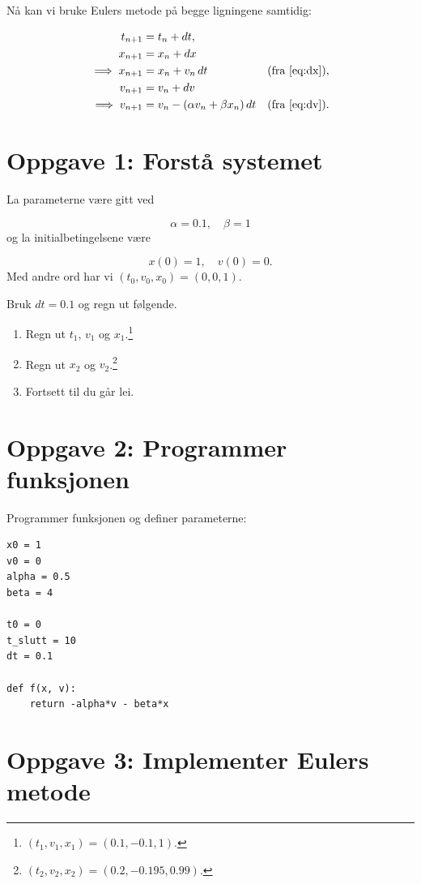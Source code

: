 \documentclass[a4paper,12pt]{article}
\begin{document}
Nå kan vi bruke Eulers metode på begge ligningene samtidig:

\begin{subequations}
\begin{align}
t_{n+1} &= t_n + dt,\\
x_{n+1} &= x_n + dx \\
\implies x_{n+1} &= x_n + v_n\, dt &(\text{fra \eqref{eq:dx}}), \\
v_{n+1} &= v_n + dv\\
\implies v_{n+1} &= v_n - (\alpha v_n + \beta x_n)\, dt &(\text{fra \eqref{eq:dv}}).
\end{align}
\end{subequations}

\section*{Oppgave 1: Forstå systemet}

La parameterne være gitt ved

\[
\alpha =  0.1, \quad \beta = 1
\]
og la initialbetingelsene være

\[
x(0) = 1, \quad v(0) = 0.
\]
Med andre ord har vi $(t_0,v_0,x_0) = (0,0,1)$.


Bruk $dt = 0.1$ og regn ut følgende.

\begin{enumerate}[label=\alph*)]
\item Regn ut $t_1$, $v_1$ og $x_1$.\footnote{$(t_1,v_1,x_1) = (0.1, -0.1, 1)$.}
\item Regn ut $x_2$ og $v_2$.\footnote{$(t_2,v_2,x_2) = (0.2, -0.195, 0.99)$.}
\item Fortsett til du går lei.
\end{enumerate}

\newpage

\section*{Oppgave 2: Programmer funksjonen}
Programmer funksjonen og definer parameterne:
\begin{lstlisting}
x0 = 1
v0 = 0
alpha = 0.5
beta = 4

t0 = 0
t_slutt = 10
dt = 0.1

def f(x, v):
    return -alpha*v - beta*x
\end{lstlisting}

\section*{Oppgave 3: Implementer Eulers metode}
\end{document}
